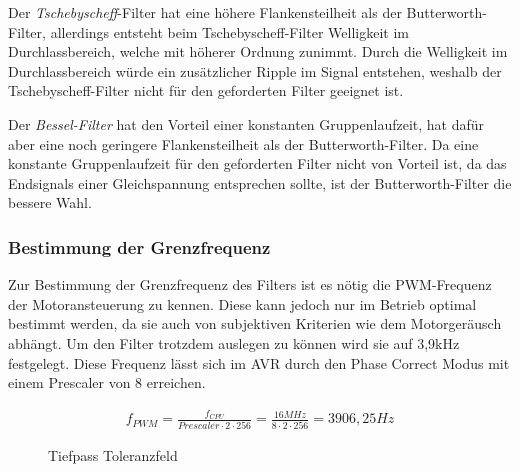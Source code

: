 Der \emph{Tschebyscheff}-Filter hat eine höhere Flankensteilheit als der But\-ter\-worth-Filter, allerdings entsteht beim Tschebyscheff-Filter Welligkeit im Durchlassbereich,
welche mit höherer Ordnung zunimmt. Durch die Welligkeit im Durchlassbereich würde ein zusätzlicher Ripple im Signal entstehen, weshalb der Tschebyscheff-Filter nicht
für den geforderten Filter geeignet ist. 

Der \emph{Bessel-Filter} hat den Vorteil einer konstanten Gruppenlaufzeit, hat dafür aber eine noch geringere Flankensteilheit als der Butterworth-Filter.
Da eine konstante Gruppenlaufzeit für den geforderten Filter nicht von Vorteil ist, da das Endsignals einer Gleichspannung entsprechen sollte, ist der Butterworth-Filter
die bessere Wahl.


\subsubsection{Bestimmung der Grenzfrequenz}

Zur Bestimmung der Grenzfrequenz des Filters ist es nötig die PWM-Frequenz der Motoransteuerung zu kennen. Diese kann jedoch nur im Betrieb optimal bestimmt werden, da sie
auch von subjektiven Kriterien wie dem Motorgeräusch abhängt. Um den Filter trotzdem auslegen zu können wird sie auf 3,9kHz festgelegt. Diese Frequenz
lässt sich im AVR durch den Phase Correct Modus mit einem Prescaler von 8 erreichen.

\begin{align*}
f_{PWM}=\frac{f_{CPU}}{Prescaler\cdot 2 \cdot 256} = \frac{16 MHz }{8 \cdot 2 \cdot 256 }=3906,25 Hz
\end{align*}


\begin{figure}[H]
\centering
{}
\caption{Tiefpass Toleranzfeld}%
\label{fig:analog}
\end{figure}



